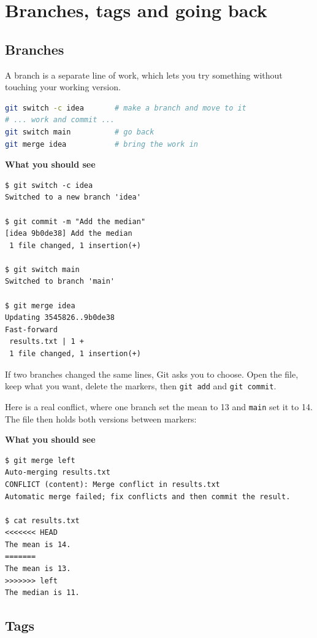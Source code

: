 \chapter{Branches, tags and going back}
\label{ch:history}

\section{Branches}\label{branches}

A branch is a separate line of work, which lets you try something without touching your working version.

\begin{lstlisting}[language=bash]
git switch -c idea       # make a branch and move to it
# ... work and commit ...
git switch main          # go back
git merge idea           # bring the work in
\end{lstlisting}

\textbf{What you should see}

\begin{lstlisting}[language=text]
$ git switch -c idea
Switched to a new branch 'idea'

$ git commit -m "Add the median"
[idea 9b0de38] Add the median
 1 file changed, 1 insertion(+)

$ git switch main
Switched to branch 'main'

$ git merge idea
Updating 3545826..9b0de38
Fast-forward
 results.txt | 1 +
 1 file changed, 1 insertion(+)
\end{lstlisting}

If two branches changed the same lines, Git asks you to choose. Open the file, keep what you want, delete the markers, then \texttt{git\ add} and \texttt{git\ commit}.

Here is a real conflict, where one branch set the mean to 13 and \texttt{main} set it to 14. The file then holds both versions between markers:

\textbf{What you should see}

\begin{lstlisting}[language=text]
$ git merge left
Auto-merging results.txt
CONFLICT (content): Merge conflict in results.txt
Automatic merge failed; fix conflicts and then commit the result.

$ cat results.txt
<<<<<<< HEAD
The mean is 14.
=======
The mean is 13.
>>>>>>> left
The median is 11.
\end{lstlisting}

\section{Tags}\label{tags}

